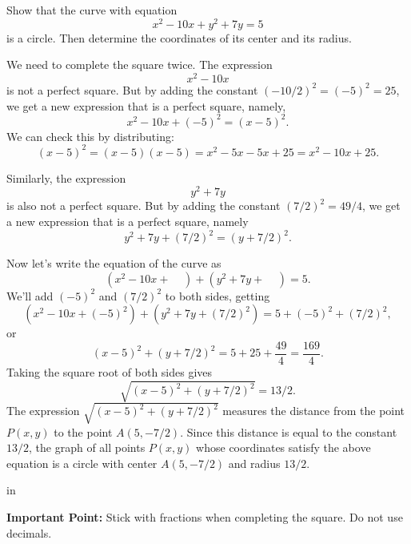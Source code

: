 \documentclass{ximera}
\newcommand{\pskip}{\vskip 0.1 in}
\begin{document}
\begin{example}
Show that the curve with equation
\[
   x^2  - 10x + y^2 + 7y = 5
\]
is a circle. Then determine the coordinates of its center and its radius.
\end{example}


\begin{explanation}
We need to complete the square twice. The expression
\[
     x^2 - 10x
\]
is not a perfect square. But by adding the constant $(-10/2)^2 = (-5)^2 = 25$, we get a new expression that is a perfect square, namely,
\[
     x^2 -10x + (-5)^2 = (x-5)^2 .
\]
We can check this by distributing:
\[
    (x-5)^2 = (x-5)(x-5) = x^2 -5x -5x + 25 = x^2 - 10x + 25 .
\]

Similarly, the expression
\[
   y^2 + 7y
\]
is also not a perfect square. But by adding the constant $(7/2)^2 = 49/4$, we get a new expression that is a perfect square, namely
\[
     y^2 + 7y + (7/2)^2 = (y+7/2)^2 .
\]

Now let's write the equation of the curve as
\[
     (x^2  - 10x + \;\;\;\; ) + (y^2 + 7y + \;\;\;\; ) = 5 .
\]
We'll add $(-5)^2$ and $(7/2)^2$ to both sides, getting
\[
     (x^2  - 10x + (-5)^2 ) + (y^2 + 7y + (7/2)^2 ) = 5 + (-5)^2 + (7/2)^2 ,
\]
or
\[
    (x-5)^2 + (y+7/2)^2 = 5 + 25 + \frac{49}{4} = \frac{169}{4} .
\]
Taking the square root of both sides gives
\[
    \sqrt{(x-5)^2 + (y+7/2)^2} = 13/2 .
\]
The expression $\sqrt{(x-5)^2 + (y+7/2)^2}$ measures the distance from the point $P(x,y)$ to the point $A(5,-7/2)$. Since this distance is equal to the constant $13/2$, the graph of all points $P(x,y)$ whose coordinates satisfy the above equation is a circle with center $A(5,-7/2)$ and radius $13/2$.

\pskip 

{\bf Important Point:} Stick with fractions when completing the square. Do not use decimals.

\end{explanation}
\end{document}
